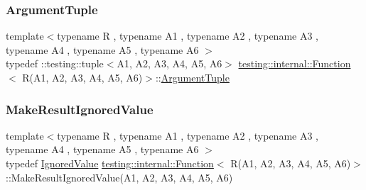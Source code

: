 \subsubsection{\texorpdfstring{ArgumentTuple}{ArgumentTuple}}
{\footnotesize\ttfamily template$<$typename R , typename A1 , typename A2 , typename A3 , typename A4 , typename A5 , typename A6 $>$ \\
typedef \+::testing\+::tuple$<$A1, A2, A3, A4, A5, A6$>$ \mbox{\hyperlink{structtesting_1_1internal_1_1Function}{testing\+::internal\+::\+Function}}$<$ R(A1, A2, A3, A4, A5, A6)$>$\+::\mbox{\hyperlink{structtesting_1_1internal_1_1Function_3_01R_07_08_4_ad483c3128c470d8cdb55c3ac1c575c11}{Argument\+Tuple}}}

\mbox{\label{structtesting_1_1internal_1_1Function_3_01R_07A1_00_01A2_00_01A3_00_01A4_00_01A5_00_01A6_08_4_a20c49ac827433a288921ca0caa0d319b}} 
\subsubsection{\texorpdfstring{MakeResultIgnoredValue}{MakeResultIgnoredValue}}
{\footnotesize\ttfamily template$<$typename R , typename A1 , typename A2 , typename A3 , typename A4 , typename A5 , typename A6 $>$ \\
typedef \mbox{\hyperlink{classtesting_1_1internal_1_1IgnoredValue}{Ignored\+Value}} \mbox{\hyperlink{structtesting_1_1internal_1_1Function}{testing\+::internal\+::\+Function}}$<$ R(A1, A2, A3, A4, A5, A6)$>$\+::Make\+Result\+Ignored\+Value(A1, A2, A3, A4, A5, A6)}

\mbox{\label{structtesting_1_1internal_1_1Function_3_01R_07A1_00_01A2_00_01A3_00_01A4_00_01A5_00_01A6_08_4_aa60c44ec945ca78297aaf7a3c785bce5}} 
